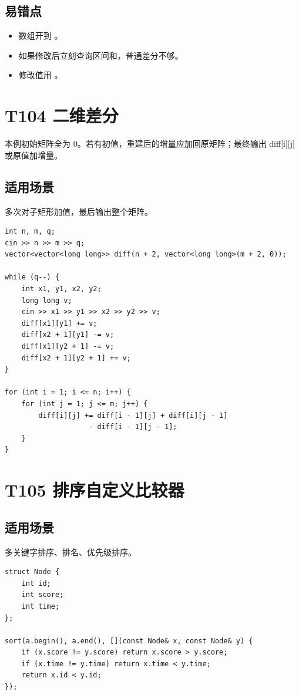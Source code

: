 \subsection{易错点}

\begin{itemize}
  \item 数组开到 。
  \item 如果修改后立刻查询区间和，普通差分不够。
  \item 修改值用 。
\end{itemize}

\section{T104 二维差分}\label{sec:09-6}\label{tpl:104}

本例初始矩阵全为 0。若有初值，重建后的增量应加回原矩阵；最终输出 diff[i][j] 或原值加增量。

\subsection{适用场景}

多次对子矩形加值，最后输出整个矩阵。

\begin{lstlisting}
int n, m, q;
cin >> n >> m >> q;
vector<vector<long long>> diff(n + 2, vector<long long>(m + 2, 0));

while (q--) {
    int x1, y1, x2, y2;
    long long v;
    cin >> x1 >> y1 >> x2 >> y2 >> v;
    diff[x1][y1] += v;
    diff[x2 + 1][y1] -= v;
    diff[x1][y2 + 1] -= v;
    diff[x2 + 1][y2 + 1] += v;
}

for (int i = 1; i <= n; i++) {
    for (int j = 1; j <= m; j++) {
        diff[i][j] += diff[i - 1][j] + diff[i][j - 1]
                    - diff[i - 1][j - 1];
    }
}
\end{lstlisting}

\section{T105 排序自定义比较器}\label{sec:09-7}\label{tpl:105}

\subsection{适用场景}

多关键字排序、排名、优先级排序。

\begin{lstlisting}
struct Node {
    int id;
    int score;
    int time;
};

sort(a.begin(), a.end(), [](const Node& x, const Node& y) {
    if (x.score != y.score) return x.score > y.score;
    if (x.time != y.time) return x.time < y.time;
    return x.id < y.id;
});
\end{lstlisting}

